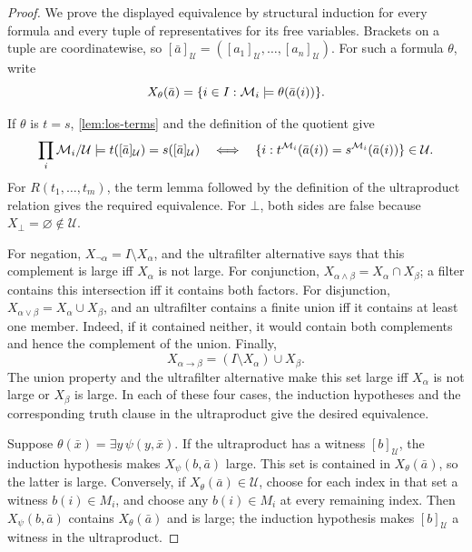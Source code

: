 \documentclass[11pt,oneside,openany]{book}
\theoremstyle{definition}
\theoremstyle{plain}
\theoremstyle{remark}
\DeclarePairedDelimiter{\set}{\lbrace}{\rbrace}
\newcommand{\entails}{\models}
\newcommand{\bottom}{\bot}
\begin{document}
\begin{proof}
We prove the displayed equivalence by structural induction for every formula
and every tuple of representatives for its free variables.  Brackets on a
tuple are coordinatewise, so
\([\bar a]_{\mathcal U}=([a_1]_{\mathcal U},\ldots,[a_n]_{\mathcal U})\).
For such a formula \(\theta\), write
\[
  X_\theta(\bar a)=
  \set{i\in I:\mathcal M_i\entails\theta(\bar a(i))}.
\]

If \(\theta\) is \(t=s\), \cref{lem:los-terms} and the definition of the
quotient give
\[
  \prod_i\mathcal M_i/\mathcal U\entails
  t([\bar a]_{\mathcal U})=s([\bar a]_{\mathcal U})
  \quad\Longleftrightarrow\quad
  \set{i:t^{\mathcal M_i}(\bar a(i))
               =s^{\mathcal M_i}(\bar a(i))}\in\mathcal U.
\]
For \(R(t_1,\ldots,t_m)\), the term lemma followed by the definition of the
ultraproduct relation gives the required equivalence.  For \(\bottom\), both
sides are false because \(X_{\bottom}=\varnothing\notin\mathcal U\).

For negation,
\(X_{\neg\alpha}=I\setminus X_\alpha\), and the ultrafilter alternative says
that this complement is large iff \(X_\alpha\) is not large.  For
conjunction,
\(X_{\alpha\land\beta}=X_\alpha\cap X_\beta\); a filter contains this
intersection iff it contains both factors.  For disjunction,
\(X_{\alpha\lor\beta}=X_\alpha\cup X_\beta\), and an ultrafilter contains a
finite union iff it contains at least one member.  Indeed, if it
contained neither, it would contain both complements and hence the complement
of the union.  Finally,
\[
  X_{\alpha\to\beta}=(I\setminus X_\alpha)\cup X_\beta.
\]
The union property and the ultrafilter alternative make this set large iff
\(X_\alpha\) is not large or \(X_\beta\) is large.  In each of these four
cases, the induction hypotheses and the corresponding truth clause in the
ultraproduct give the desired equivalence.

Suppose \(\theta(\bar x)=\exists y\,\psi(y,\bar x)\).  If the ultraproduct
has a witness \([b]_{\mathcal U}\), the induction hypothesis makes
\(X_\psi(b,\bar a)\) large.  This set is contained in
\(X_\theta(\bar a)\), so the latter is large.  Conversely, if
\(X_\theta(\bar a)\in\mathcal U\), choose for each index in that set a
witness \(b(i)\in M_i\), and choose any \(b(i)\in M_i\) at every remaining
index.  Then \(X_\psi(b,\bar a)\) contains \(X_\theta(\bar a)\) and is large;
the induction hypothesis makes \([b]_{\mathcal U}\) a witness in the
ultraproduct.


\end{proof}
\end{document}
